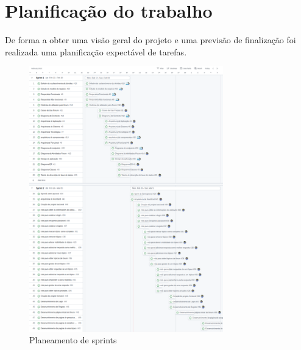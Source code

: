\newpage

\section{Planificação do trabalho}

De forma a obter uma visão geral do projeto e uma previsão de finalização foi realizada uma planificação 
expectável de tarefas.

\begin{figure}[htb]
    \centering
    
    \includegraphics[width=0.75\textwidth]{images/etapa1_sprint_planning.png}
    \caption{Planeamento de sprints}
    \label{fig:1}
\end{figure}



